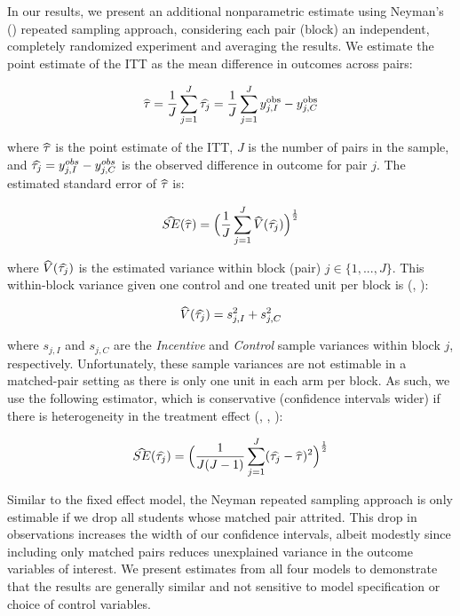 \documentclass[12pt]{article}
\newcommand\wh[1]{\hstretch{2}{\hat{\hstretch{.5}{#1}}}}
\begin{document}
In our results, we present an additional nonparametric estimate using Neyman's (\citeyear{neyman1923}) repeated sampling approach, considering each pair (block) an independent, completely randomized experiment and averaging the results. We estimate the point estimate of the ITT as the mean difference in outcomes across pairs:

\begin{equation} \label{neyman_spec}
	\wh{\tau} = \frac{1}{J}\sum_{j=1}^{J} \wh{\tau_j} = \frac{1}{J}\sum_{j=1}^{J} y^\text{obs}_{j,I} - y^\text{obs}_{j,C}
\end{equation}

where $\wh{\tau}$ is the point estimate of the ITT, $J$ is the number of pairs in the sample, and $\wh{\tau_j} = y^{obs}_{j,I} - y^{obs}_{j,C}$ is the observed difference in outcome for pair $j$. The estimated standard error of $\wh{\tau}$ \citep{imai2008, ir2015, ai2017} is:

\begin{equation} \label{se_neyman}
	\wh{SE}(\wh{\tau}) = \Big(\frac{1}{J}\sum_{j=1}^{J} \wh{V}(\wh{\tau_j}) \Big)^\frac{1}{2}
\end{equation}

where $\wh{V}(\wh{\tau_j})$ is the estimated variance within block (pair) $j\in \{1,...,J\}$. This within-block variance given one control and one treated unit per block is (\cite{ir2015}, \cite{ai2017}):

\begin{equation} \label{v_block}
	\wh{V}(\wh{\tau_j}) = s_{j, I}^2 + s_{j, C}^2
\end{equation}

where $s_{j, I}$ and $s_{j, C}$ are the \textit{Incentive} and \textit{Control} sample variances within block $j$, respectively. Unfortunately, these sample variances are not estimable in a matched-pair setting as there is only one unit in each arm per block. As such, we use the following estimator, which is conservative (confidence intervals wider) if there is heterogeneity in the treatment effect (\cite{imai2008}, \cite{ir2015}, \cite{ai2017}):

\begin{equation} \label{se_imai}
	\wh{SE}(\wh{\tau_j}) = \Big(\frac{1}{J(J-1)}\sum_{j=1}^{J} (\wh{\tau_j} - \wh{\tau})^2 \Big)^\frac{1}{2}
\end{equation}

Similar to the fixed effect model, the Neyman repeated sampling approach is only estimable if we drop all students whose matched pair attrited. This drop in observations increases the width of our confidence intervals, albeit modestly since including only matched pairs reduces unexplained variance in the outcome variables of interest. We present estimates from all four models to demonstrate that the results are generally similar and not sensitive to model specification or choice of control variables.
\end{document}
